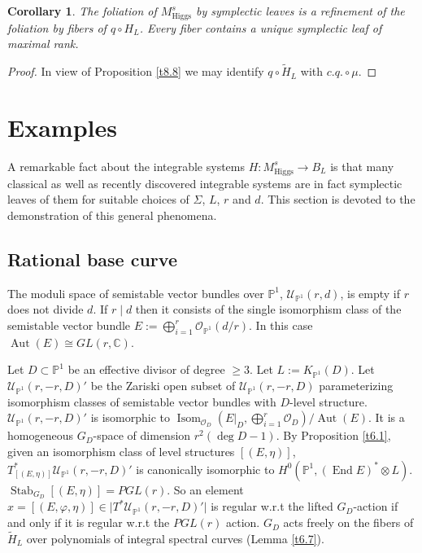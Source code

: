 \documentclass[12pt,a4paper,oneside,english]{smfart}
\newtheorem{cor}[thm]{Corollary}
\theoremstyle{definition}
\theoremstyle{remark}
\DeclareMathOperator{\End}{End}
\DeclareMathOperator{\Isom}{Isom}
\DeclareMathOperator{\Aut}{Aut}
\DeclareMathOperator{\Stab}{Stab}
\newcommand{\Hig}{\mathrm{Higgs}}
\newcommand{\MHs}{M^{s}_{\Hig}}
\newcommand{\cU}{\mathcal{U}}
\newcommand{\cO}{\mathcal{O}}
\newcommand{\tot}[1]{\lvert #1 \rvert}
\newcommand{\HL}{\widetilde{H}_{L}}
\begin{document}
\begin{cor}\label{t8.10}
The foliation of $\MHs$ by symplectic leaves is a refinement of the foliation by fibers of $q \circ H_L$. Every fiber contains a unique symplectic leaf of maximal rank.
\end{cor}

\begin{proof}
In view of Proposition \ref{t8.8} we may identify $q \circ \HL$ with $c.q. \circ \mu$.
\end{proof}

\section{Examples}\label{sec:9}

A remarkable fact about the integrable systems $H \colon \MHs \to B_L$ is that many classical as well as recently discovered integrable systems are in fact symplectic leaves of them for suitable choices of $\Sigma$, $L$, $r$ and $d$. This section is devoted to the demonstration of this general phenomena.

\subsection{Rational base curve}\label{sec:9.1}

The moduli space of semistable vector bundles over $\mathbb{P}^1$, $\cU_{\mathbb{P}^1}(r, d)$, is empty if $r$ does not divide $d$. If $r \mid d$ then it consists of the single isomorphism class of the semistable vector bundle $E := \bigoplus_{i=1}^{r} \cO_{\mathbb{P}^1}(d/r)$. In this case $\Aut(E) \cong GL(r, \mathbb{C})$.

Let $D \subset \mathbb{P}^1$ be an effective divisor of degree $\geqslant 3$. Let $L := K_{\mathbb{P}^1}(D)$. Let $\cU_{\mathbb{P}^1}(r, -r, D)'$ be the Zariski open subset of $\cU_{\mathbb{P}^1}(r, -r, D)$ parameterizing isomorphism classes of semistable vector bundles with $D$-level structure. $\cU_{\mathbb{P}^1}(r, -r, D)'$ is isomorphic to $\Isom_{\cO_D}(E|_D, \bigoplus_{i=1}^{r} \cO_D)/\Aut(E)$. It is a homogeneous $G_D$-space of dimension $r^2(\deg D - 1)$. By Proposition \ref{t6.1}, given an isomorphism class of level structures $[(E, \eta)]$, $T^*_{[(E, \eta)]}\cU_{\mathbb{P}^1}(r, -r, D)'$ is canonically isomorphic to $H^0(\mathbb{P}^1, (\End E)^* \otimes L)$. $\Stab_{G_D}[(E, \eta)] = PGL(r)$. So an element $x = [(E, \varphi, \eta)] \in \tot{T^*\cU_{\mathbb{P}^1}(r, -r, D)'}$ is regular w.r.t the lifted $G_D$-action if and only if it is regular w.r.t the $PGL(r)$ action. $G_D$ acts freely on the fibers of $\HL$ over polynomials of integral spectral curves (Lemma \ref{t6.7}).
\end{document}
